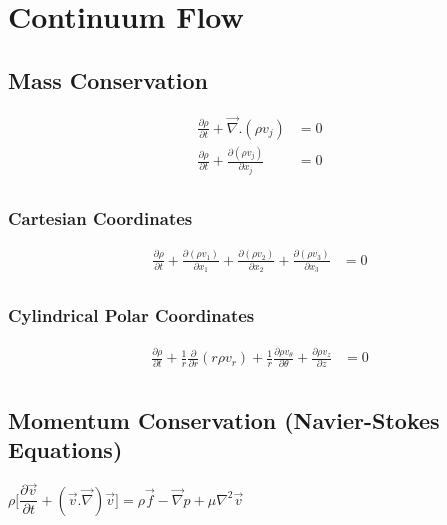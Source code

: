\documentclass[11pt, letterpaper, notitlepage]{article}
\begin{document}
\newpage
\section{Continuum Flow}
\subsection{Mass Conservation}
\begin{align*}
\frac{\partial \rho}{\partial t} + \vec{\nabla} . (\rho v_j) &= 0 \\
\frac{\partial \rho}{\partial t} + \frac{\partial (\rho v_j)}{\partial x_j} &= 0 \\
\end{align*}

\subsubsection{Cartesian Coordinates}
\begin{align*}
\frac{\partial \rho}{\partial t} + \frac{\partial (\rho v_1)}{\partial x_1} + \frac{\partial (\rho v_2)}{\partial x_2} + \frac{\partial (\rho v_3)}{\partial x_3} &= 0 \\
\end{align*}

\subsubsection{Cylindrical Polar Coordinates}
\begin{align*}
\frac{\partial \rho}{\partial t} + \frac{1}{r} \frac{\partial}{\partial r} (r \rho v_r) + \frac{1}{r} \frac{\partial \rho v_{\theta}}{\partial \theta} + \frac{\partial \rho v_z}{\partial z} &= 0 \\
\end{align*}

\subsection{Momentum Conservation (Navier-Stokes Equations)}
$\rho \biggl[\dfrac{\partial{\vec{v}}}{\partial t} + (\vec{v}.\vec{\nabla})\vec{v}\biggr] = \rho \vec{f} -\vec{\nabla} p + \mu \nabla^2 \vec{v}$
\end{document}
